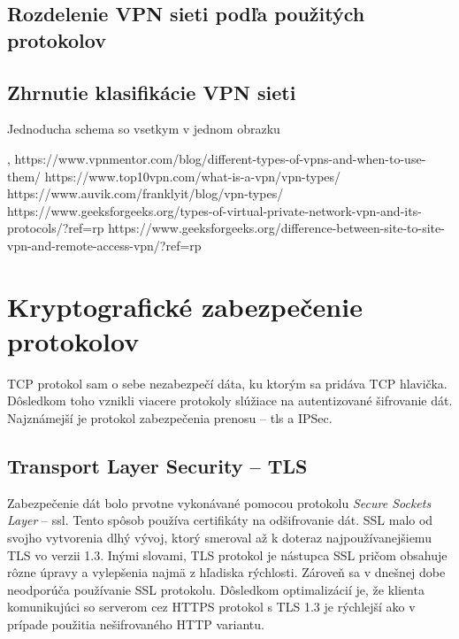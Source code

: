 \subsection{Rozdelenie VPN sieti podľa použitých protokolov}  
\subsection{Zhrnutie klasifikácie VPN sieti}
 Jednoducha schema so vsetkym v jednom obrazku 
 
\cite{divvpn}, \cite{ciscovpn}
https://www.vpnmentor.com/blog/different-types-of-vpns-and-when-to-use-them/
https://www.top10vpn.com/what-is-a-vpn/vpn-types/
https://www.auvik.com/franklyit/blog/vpn-types/
https://www.geeksforgeeks.org/types-of-virtual-private-network-vpn-and-its-protocols/?ref=rp
https://www.geeksforgeeks.org/difference-between-site-to-site-vpn-and-remote-access-vpn/?ref=rp


\section{Kryptografické zabezpečenie protokolov}
TCP protokol sam o sebe nezabezpečí dáta, ku ktorým sa pridáva TCP hlavička. Dôsledkom toho vznikli viacere protokoly slúžiace na autentizované šifrovanie dát. Najznámejší je protokol zabezpečenia prenosu -- \acrshort{tls} a IPSec.
\subsection{Transport Layer Security -- TLS}
Zabezpečenie dát bolo prvotne vykonávané pomocou protokolu \textit{Secure Sockets Layer} -- \acrshort{ssl}. Tento spôsob používa certifikáty na odšifrovanie dát. SSL malo od svojho vytvorenia dlhý vývoj, ktorý smeroval až k doteraz najpoužívanejšiemu TLS vo verzii 1.3. Inými slovami, TLS protokol je nástupca SSL pričom obsahuje rôzne úpravy a vylepšenia najmä z hľadiska rýchlosti. Zároveň sa v dnešnej dobe neodporúča používanie SSL protokolu. Dôsledkom optimalizácií je, že klienta komunikujúci so serverom cez HTTPS protokol s TLS 1.3 je rýchlejší ako v prípade použitia nešifrovaného HTTP variantu. 

